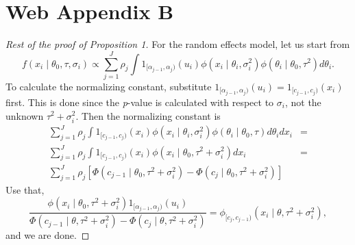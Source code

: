 \section*{Web Appendix B}

\begin{proof}[Rest of the proof of Proposition 1]
For the random effects model, let us start from
\[
f(x_{i}\mid\theta_{0},\tau,\sigma_{i})\propto\sum_{j=1}^{J}\rho_{j}\int1_{[\alpha_{j-1},\alpha_{j})}(u_{i})\phi(x_{i}\mid\theta_{i},\sigma_{i}^2)\phi(\theta_{i}\mid\theta_{0},\tau^2)d\theta_{i}.
\]
To calculate the normalizing constant, substitute $1_{[\alpha_{j-1},\alpha_{j})}(u_{i})=1_{[c_{j-1},c_{j})}(x_{i})$
first. This is done since the \emph{p}-value is calculated with respect
to $\sigma_{i}$, not the unknown ${\tau^{2}+\sigma_{i}^{2}}$.
Then the normalizing constant is
\begin{eqnarray*}
\sum_{j=1}^{J}\rho_{j}\int1_{[c_{j-1},c_{j})}(x_{i})\phi(x_{i}\mid\theta_{i},\sigma_{i}^2)\phi(\theta_{i}\mid\theta_{0},\tau)d\theta_{i}dx_{i} & =\\
\sum_{j=1}^{J}\rho_{j}\int1_{[c_{j-1},c_{j})}(x_{i})\phi(x_{i}\mid\theta_{0},{\tau^{2}+\sigma_{i}^{2}})dx_{i} & =\\
\sum_{j=1}^{J}\rho_{j}\left[\Phi(c_{j-1}\mid\theta_{0},{\tau^{2}+\sigma_{i}^{2}})-\Phi(c_{j}\mid\theta_{0},{\tau^{2}+\sigma_{i}^{2}})\right]
\end{eqnarray*}
Use that,
\[
\frac{\phi(x_{i}\mid\theta_{0},{\tau^{2}+\sigma_{i}^{2}})1_{[\alpha_{j-1},\alpha_{j})}(u_{i})}{\Phi(c_{j-1}\mid\theta,{\tau^{2}+\sigma_{i}^{2}})-\Phi(c_{j}\mid\theta,{\tau^{2}+\sigma_{i}^{2}})}=\phi_{[c_{j},c_{j-1})}(x_{i}\mid\theta,{\tau^{2}+\sigma_{i}^{2}}),
\]
and we are done.
\end{proof}